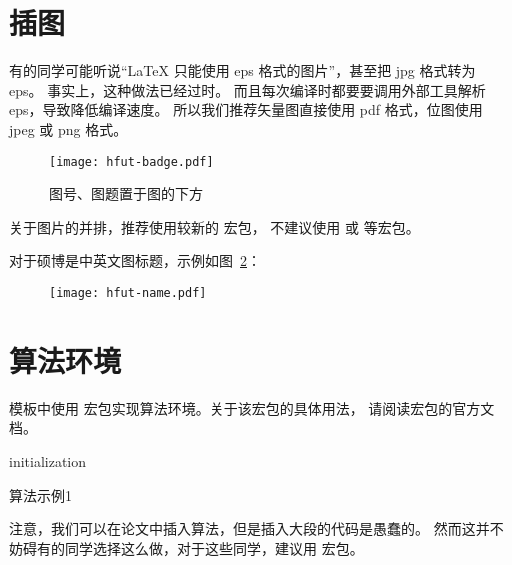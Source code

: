 \section{插图}

有的同学可能听说“\LaTeX{} 只能使用 eps 格式的图片”，甚至把 jpg 格式转为 eps。
事实上，这种做法已经过时。
而且每次编译时都要要调用外部工具解析 eps，导致降低编译速度。
所以我们推荐矢量图直接使用 pdf 格式，位图使用 jpeg 或 png 格式。
\begin{figure}[h]
  \centering
  \texttt{[image: hfut-badge.pdf]}
  \caption{图号、图题置于图的下方} %
  \label{fig:badge}
\end{figure}

关于图片的并排，推荐使用较新的  宏包，
不建议使用  或  等宏包。\par

对于硕博是中英文图标题，示例如图~\ref{fig:example-zh-en}：
\begin{figure}[h]
  \centering
  \texttt{[image: hfut-name.pdf]}
  \label{fig:example-zh-en}
\end{figure}
\section{算法环境}

模板中使用  宏包实现算法环境。关于该宏包的具体用法，
请阅读宏包的官方文档。

\begin{algorithm}[h]
  \SetAlgoLined

  initialization\;
  \caption{算法示例1}
  \label{algo:algorithm1}
\end{algorithm}

注意，我们可以在论文中插入算法，但是插入大段的代码是愚蠢的。
然而这并不妨碍有的同学选择这么做，对于这些同学，建议用  宏包。
